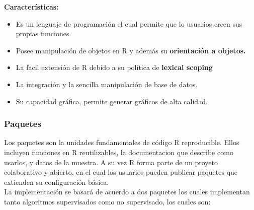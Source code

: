 \documentclass[journal]{IEEEtran}
\begin{document}
\textbf{Características:}
\begin{itemize}
\item Es un lenguaje de programación el cual permite que lo usuarios creen sus propias funciones.
\item Posee manipulación de objetos en R y además su \textbf{orientación a objetos.}
\item La facil extensión de R debido a su política de \textbf{lexical scoping}
\item La integración y la sencilla manipulación de base de datos.
\item Su capacidad gráfica, permite generar gráficos de alta calidad.\\
\end{itemize}

\subsubsection{Paquetes}
Los paquetes son la unidades fundamentales de código R reproducible. Ellos incluyen funciones en R reutilizables, la documentacion que describe como usarlos, y datos de la muestra. A su vez R forma parte de un proyeto colaborativo y abierto, en el cual los usuarios pueden publicar paquetes que extienden su configuración básica.\\

La implementación se basará de acuerdo a dos paquetes los cuales implementan tanto algoritmos supervisados como no supervisado, los cuales son:\\
\end{document}
